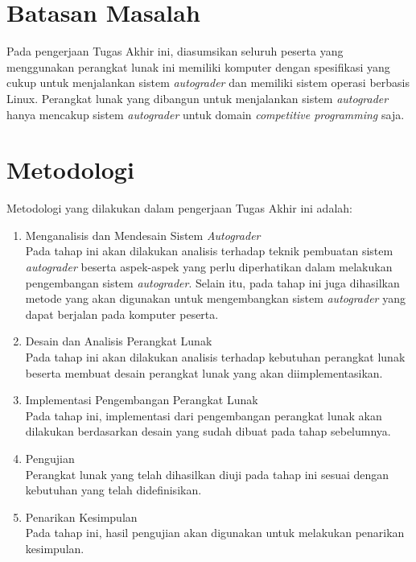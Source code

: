 \section{Batasan Masalah}

\par Pada pengerjaan Tugas Akhir ini, diasumsikan seluruh peserta yang menggunakan perangkat lunak ini memiliki komputer dengan spesifikasi yang cukup untuk menjalankan sistem \textit{autograder} dan memiliki sistem operasi berbasis Linux. Perangkat lunak yang dibangun untuk menjalankan sistem \textit{autograder} hanya mencakup sistem \textit{autograder} untuk domain \textit{competitive programming} saja.

\section{Metodologi}

\par Metodologi yang dilakukan dalam pengerjaan Tugas Akhir ini adalah:
\begin{enumerate}

	\item Menganalisis dan Mendesain Sistem \textit{Autograder} \\ Pada tahap ini akan dilakukan analisis terhadap teknik pembuatan sistem \textit{autograder} beserta aspek-aspek yang perlu diperhatikan dalam melakukan pengembangan sistem \textit{autograder}. Selain itu, pada tahap ini juga dihasilkan metode yang akan digunakan untuk mengembangkan sistem \textit{autograder} yang dapat berjalan pada komputer peserta.
	
	\item Desain dan Analisis Perangkat Lunak \\ Pada tahap ini akan dilakukan analisis terhadap kebutuhan perangkat lunak beserta membuat desain perangkat lunak yang akan diimplementasikan.
	
	\item Implementasi Pengembangan Perangkat Lunak \\ Pada tahap ini, implementasi dari pengembangan perangkat lunak akan dilakukan berdasarkan desain yang sudah dibuat pada tahap sebelumnya.
	
	\item Pengujian \\ Perangkat lunak yang telah dihasilkan diuji pada tahap ini sesuai dengan kebutuhan yang telah didefinisikan.
	
	\item Penarikan Kesimpulan \\ Pada tahap ini, hasil pengujian akan digunakan untuk melakukan penarikan kesimpulan.

\end{enumerate}


